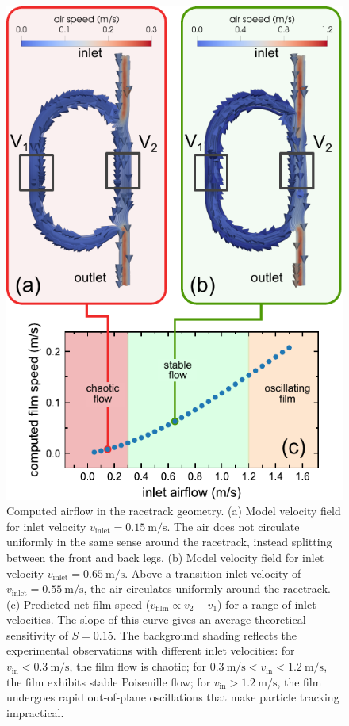 \documentclass[aagreenthesis]{subfiles}
\begin{document}
\begin{figure}[h!]
\centering
\includegraphics[keepaspectratio=true,width=.6\textwidth]{./figs/racetrack/simulation/simulation.pdf}
    \caption{Computed airflow in the racetrack geometry.
        (a) Model velocity field for inlet velocity $v_\text{inlet} =
        \SI[per-mode=symbol]{0.15}{\metre\per\second}$. The air does not circulate uniformly in the same sense around the racetrack,
    instead splitting between the front and back legs.
        (b) Model velocity field for inlet velocity $v_\text{inlet} =
        \SI[per-mode=symbol]{0.65}{\metre\per\second}$. Above a transition inlet velocity of
        $v_\text{inlet} = \SI[per-mode=symbol]{0.55}{\metre\per\second}$, the air circulates
        uniformly around the racetrack.
        (c) Predicted net film speed ($v_\textrm{film} \propto v_2-v_1$) for a
    range of inlet velocities. The slope of this curve gives an average theoretical sensitivity of
    $S= 0.15$. The background shading reflects the experimental
    observations with different inlet velocities: for  $v_\text{in} <
    \SI[per-mode=symbol]{0.3}{\metre\per\second}$, the film flow is chaotic; for
    $\SI[per-mode=symbol]{0.3}{\metre\per\second} < v_\text{in} <
    \SI[per-mode=symbol]{1.2}{\metre\per\second}$, the film exhibits stable
    Poiseuille flow; for $v_\text{in} > \SI[per-mode=symbol]{1.2}{\metre\per\second}$, the film
    undergoes rapid out-of-plane oscillations that make particle tracking
    impractical. \label{fig:simulation}}
\end{figure}
\end{document}
